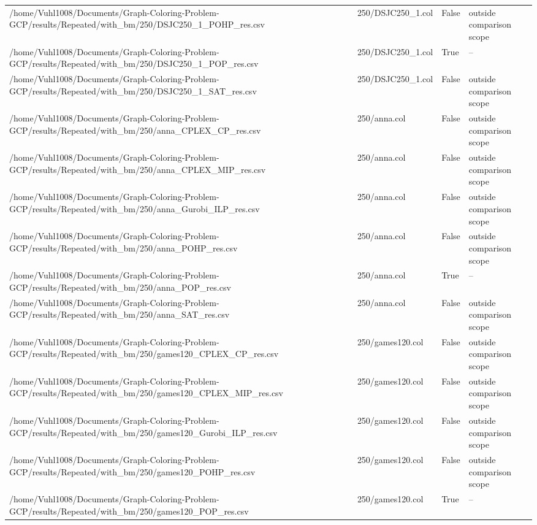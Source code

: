 \begin{table}[htbp]
\begin{tabular}{llll}
/home/Vuhl1008/Documents/Graph-Coloring-Problem-GCP/results/Repeated/with\_bm/250/DSJC250\_1\_POHP\_res.csv & 250/DSJC250\_1.col & False & outside comparison scope \\
/home/Vuhl1008/Documents/Graph-Coloring-Problem-GCP/results/Repeated/with\_bm/250/DSJC250\_1\_POP\_res.csv & 250/DSJC250\_1.col & True & -- \\
/home/Vuhl1008/Documents/Graph-Coloring-Problem-GCP/results/Repeated/with\_bm/250/DSJC250\_1\_SAT\_res.csv & 250/DSJC250\_1.col & False & outside comparison scope \\
/home/Vuhl1008/Documents/Graph-Coloring-Problem-GCP/results/Repeated/with\_bm/250/anna\_CPLEX\_CP\_res.csv & 250/anna.col & False & outside comparison scope \\
/home/Vuhl1008/Documents/Graph-Coloring-Problem-GCP/results/Repeated/with\_bm/250/anna\_CPLEX\_MIP\_res.csv & 250/anna.col & False & outside comparison scope \\
/home/Vuhl1008/Documents/Graph-Coloring-Problem-GCP/results/Repeated/with\_bm/250/anna\_Gurobi\_ILP\_res.csv & 250/anna.col & False & outside comparison scope \\
/home/Vuhl1008/Documents/Graph-Coloring-Problem-GCP/results/Repeated/with\_bm/250/anna\_POHP\_res.csv & 250/anna.col & False & outside comparison scope \\
/home/Vuhl1008/Documents/Graph-Coloring-Problem-GCP/results/Repeated/with\_bm/250/anna\_POP\_res.csv & 250/anna.col & True & -- \\
/home/Vuhl1008/Documents/Graph-Coloring-Problem-GCP/results/Repeated/with\_bm/250/anna\_SAT\_res.csv & 250/anna.col & False & outside comparison scope \\
/home/Vuhl1008/Documents/Graph-Coloring-Problem-GCP/results/Repeated/with\_bm/250/games120\_CPLEX\_CP\_res.csv & 250/games120.col & False & outside comparison scope \\
/home/Vuhl1008/Documents/Graph-Coloring-Problem-GCP/results/Repeated/with\_bm/250/games120\_CPLEX\_MIP\_res.csv & 250/games120.col & False & outside comparison scope \\
/home/Vuhl1008/Documents/Graph-Coloring-Problem-GCP/results/Repeated/with\_bm/250/games120\_Gurobi\_ILP\_res.csv & 250/games120.col & False & outside comparison scope \\
/home/Vuhl1008/Documents/Graph-Coloring-Problem-GCP/results/Repeated/with\_bm/250/games120\_POHP\_res.csv & 250/games120.col & False & outside comparison scope \\
/home/Vuhl1008/Documents/Graph-Coloring-Problem-GCP/results/Repeated/with\_bm/250/games120\_POP\_res.csv & 250/games120.col & True & -- \\

\end{tabular}
\end{table}

